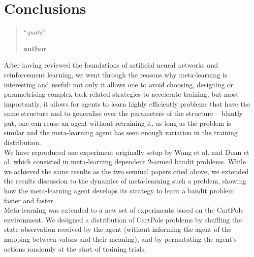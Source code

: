 \chapter{Conclusions}
\begin{quotation}
\noindent ``\emph{quote}''
\begin{flushright}\textbf{author}\end{flushright}
\end{quotation}

After having reviewed the foundations of artificial neural networks and
reinforcement learning, we went through the reasons why meta-learning is
interesting and useful: not only it allows one to avoid choosing, designing
or parametrising complex task-related strategies to accelerate training, but
most importantly, it allows for agents to learn highly efficiently problems
that have the same structure and to generalise over the parameters of the 
structure -- bluntly put, one can reuse an agent without retraining it, as long
as the problem is similar and the meta-learning agent has seen enough
variation in the training distribution.\\

We have reproduced one experiment originally setup by Wang et al. 
\cite{learningtorl} and Duan et al. \cite{fastrlviaslowrl} which consisted
in meta-learning dependent 2-armed bandit problems. While we achieved the
same results as the two seminal papers cited above, we extended the results
discussion to the dynamics of meta-learning such a problem, showing how
the meta-learning agent develops its strategy to learn a bandit problem faster
and faster.\\

Meta-learning was extended to a new set of experiments based on the CartPole
environment. We designed a distribution of CartPole problems by shuffling
the state observation received by the agent (without informing the agent
of the mapping between values and their meaning), and by permutating 
the agent's actions randomly at the start of training trials.\\

